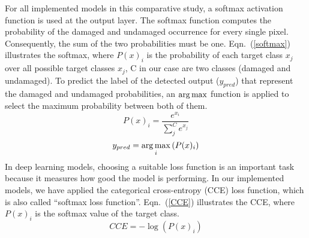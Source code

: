 For all implemented models in this comparative study, a softmax activation function is used at the output layer.
The softmax function computes the probability of the damaged and undamaged occurrence for every single pixel.
Consequently, the sum of the two probabilities must be one. 
Eqn.~(\ref{softmax}) illustrates the softmax, where \(P(x)_{i}\) is the probability of each target class \(x_{j}\) over all possible target classes \(x_{j}\), C in our case are two classes  (damaged and undamaged).
To predict the label of the detected output (\(y_{pred}\)) that represent the damaged and undamaged probabilities, an \(\operatorname*{arg\,max}\) function is applied to select the maximum probability between both of them.
	\begin{equation}
		P(x)_{i} = \frac{e^{x_{i}}}{\sum_{j}^{C} e^{x_{j}}}
		\label{softmax}
	\end{equation} 
	\begin{equation}
		y_{pred} = \operatorname*{arg\,max}_{i}\left( P(x)_{i} \right)
		\label{argmax}
	\end{equation}
In deep learning models, choosing a suitable loss function is an important task because it measures how good the model is performing.
In our implemented models, we have applied the categorical cross-entropy (CCE) loss function, which is also called \enquote{softmax loss function}.
Eqn.~(\ref{CCE}) illustrates the CCE, where \( P(x)_{i}\) is the softmax value of the target class. 
	\begin{equation}
	CCE = -\log\left( P(x)_{i} \right)
	\label{CCE}
	\end{equation}

